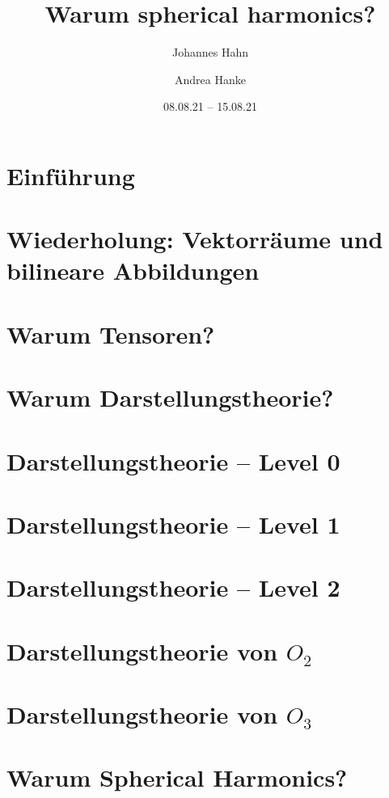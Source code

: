 \documentclass[fontsize=11pt,fleqn,a4paper]{scrartcl}
\author{Johannes Hahn \and Andrea Hanke}
\title{Warum spherical harmonics?}
\date{08.08.21 -- 15.08.21}
\begin{document}
\maketitle

\tableofcontents
\newpage
\setcounter{section}{-1}
\section{Einführung}

\section{Wiederholung: Vektorräume und bilineare Abbildungen}

\section{Warum Tensoren?}



\section{Warum Darstellungstheorie?}




\section{Darstellungstheorie -- Level 0}




\section{Darstellungstheorie -- Level 1}




\section{Darstellungstheorie -- Level 2}


\section{Darstellungstheorie \texorpdfstring{von $O_2$}{der Isometriegruppe der Ebene}}

\section{Darstellungstheorie \texorpdfstring{von $O_3$}{der Isometriegruppe des dreidimensionalen Raums}}


\section{Warum Spherical Harmonics?}

\end{document}
